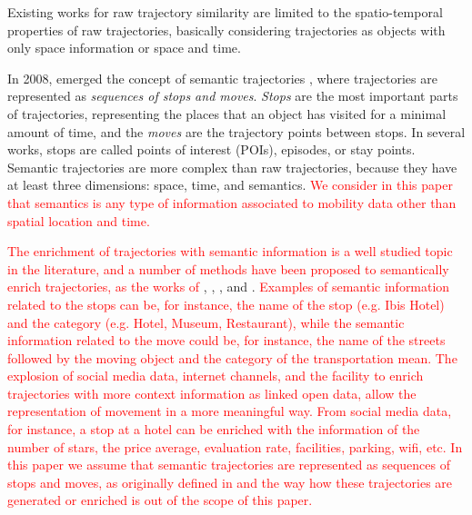 \documentclass[12pt]{article}
\begin{document}
Existing works for raw trajectory similarity are limited to the spatio-temporal properties of raw trajectories, basically considering trajectories as objects with only space information or space and time.

In 2008, emerged the concept of semantic trajectories \cite{Spaccapietra:2008:CVT:1347466.1347785}, where trajectories are represented as \emph{sequences of stops and moves}. \emph{Stops} are the most important parts of trajectories, representing the places that an object has visited for a minimal amount of time, and the \emph{moves} are the trajectory points between stops. In several works, stops are called points of interest (POIs), episodes, or stay points. Semantic trajectories are more complex than raw trajectories, because they have at least three dimensions: space, time, and semantics. \textcolor{red}{We consider in this paper that semantics is any type of information associated to mobility data other than spatial location and time.}

\textcolor{red}{The enrichment of trajectories with semantic information is a well studied topic in the literature, and a number of methods have been proposed to semantically enrich trajectories, as the works of} \cite{alvares2007model}, \cite{Palma2008}, \cite{manso}, and \cite{fileto2013baquara}. \textcolor{red}{Examples of semantic information related to the stops can be, for instance, the name of the stop (e.g. Ibis Hotel) and the category (e.g. Hotel, Museum, Restaurant), while the semantic information related to the move could be, for instance, the name of the streets followed by the moving object and the category of the transportation mean. The explosion of social media data, internet channels, and the facility to enrich trajectories with more context information as linked open data, allow the representation of movement in a more meaningful way. From social media data, for instance, a stop at a hotel can be enriched with the information of the number of stars, the price average, evaluation rate, facilities, parking, wifi, etc.  In this paper we assume that semantic trajectories are represented as sequences of stops and moves, as originally defined in \cite{Spaccapietra:2008:CVT:1347466.1347785} and the way how these trajectories are generated or enriched is out of the scope of this paper. }
\end{document}
